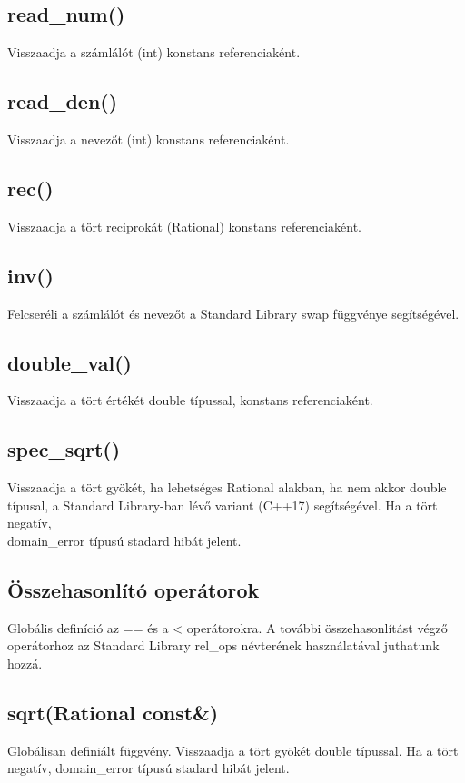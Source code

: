 \documentclass[a4paper, 12pt]{article}
\begin{document}
\subsection*{read\_num()}
Visszaadja a számlálót (int) konstans referenciaként.

\subsection*{read\_den()}
Visszaadja a nevezőt (int) konstans referenciaként.

\subsection*{rec()}
Visszaadja a tört reciprokát (Rational) konstans referenciaként.

\subsection*{inv()}
Felcseréli a számlálót és nevezőt a Standard Library swap függvénye segítségével. 

\subsection*{double\_val()}
Visszaadja a tört értékét double típussal, konstans referenciaként.

\subsection*{spec\_sqrt()}
Visszaadja a tört gyökét, ha lehetséges Rational alakban, ha nem akkor double típusal, a Standard Library-ban lévő variant (C++17)  segítségével. Ha a tört negatív, \\domain\_error típusú stadard hibát jelent.

\subsection*{Összehasonlító operátorok}
Globális definíció az == és a < operátorokra. A további összehasonlítást végző operátorhoz az Standard Library rel\_ops névterének használatával juthatunk hozzá.

\subsection*{sqrt(Rational const\&)}
Globálisan definiált függvény. Visszaadja a tört gyökét double típussal. Ha a tört negatív, domain\_error típusú stadard hibát jelent.
\end{document}
